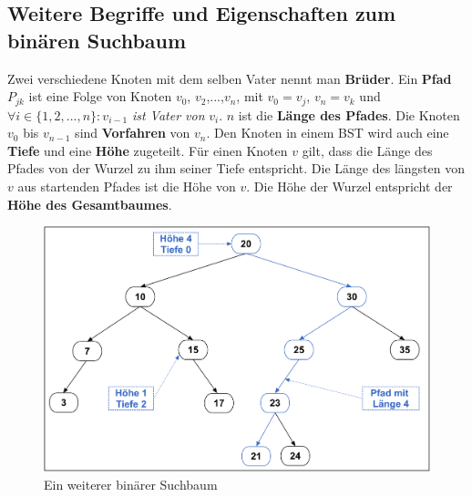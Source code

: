 \documentclass[a4paper,12pt]{article}
\begin{document}
\subsection{Weitere Begriffe und Eigenschaften zum binären Suchbaum}	
\noindent Zwei verschiedene Knoten mit dem selben Vater nennt man \textbf{Brüder}. Ein \textbf{Pfad} $P_{jk}$ ist eine Folge von Knoten $v_0$, $v_2$,...,$v_n$, mit $v_0 = v_j$, $v_n = v_k$ und $\forall i \in \{ 1, 2,..., n \} \colon v_{i-1}$ \textit{ist Vater von} $v_i$. $n$ ist die \textbf{Länge des Pfades}. Die Knoten  $v_0$ bis $v_{n-1}$ sind \textbf{Vorfahren} von $v_n$. Den Knoten in einem BST wird auch eine \textbf{Tiefe} und eine \textbf{Höhe} zugeteilt. Für einen Knoten $v$ gilt, dass die Länge des Pfades von der Wurzel zu ihm seiner Tiefe entspricht. Die Länge des längsten von $v$ aus startenden Pfades ist die Höhe von $v$. Die Höhe der Wurzel entspricht der \textbf{Höhe des Gesamtbaumes}.
\begin{figure}[h]
	\centering
	\includegraphics[width= 1\textwidth]{"Medien/Einleitung/suchbaum2_2"}
	\caption{Ein weiterer binärer Suchbaum }
	\label{fig:suchbaum2_2}
\end{figure}
\end{document}
